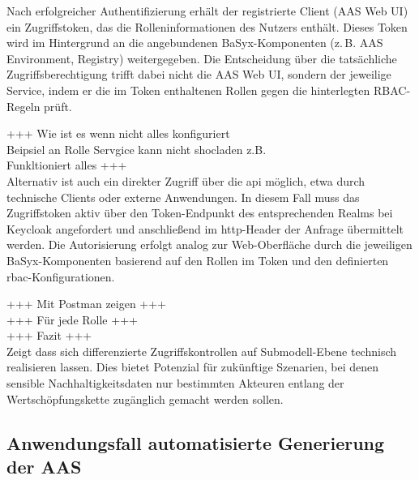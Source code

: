 Nach erfolgreicher Authentifizierung erhält der registrierte Client (AAS Web UI) ein Zugriffstoken, das die Rolleninformationen des Nutzers enthält.  
Dieses Token wird im Hintergrund an die angebundenen BaSyx-Komponenten (z.\,B. AAS Environment, Registry) weitergegeben.  
Die Entscheidung über die tatsächliche Zugriffsberechtigung trifft dabei nicht die AAS Web UI, sondern der jeweilige Service, indem er die im Token enthaltenen Rollen gegen die hinterlegten RBAC-Regeln prüft.

+++ Wie ist es wenn nicht alles konfiguriert \\
Beipsiel an Rolle Servgice kann nicht shocladen z.B.\\
 Funkltioniert alles +++\\

Alternativ ist auch ein direkter Zugriff über die \acs{api} möglich, etwa durch technische Clients oder externe Anwendungen.  
In diesem Fall muss das Zugriffstoken aktiv über den Token-Endpunkt des entsprechenden Realms bei Keycloak angefordert und anschließend im \acs{http}-Header der Anfrage übermittelt werden.  
Die Autorisierung erfolgt analog zur Web-Oberfläche durch die jeweiligen BaSyx-Komponenten basierend auf den Rollen im Token und den definierten \acs{rbac}-Konfigurationen.

+++ Mit Postman zeigen +++\\
+++ Für jede Rolle +++\\

+++ Fazit +++ \\

Zeigt dass sich differenzierte Zugriffskontrollen auf Submodell-Ebene technisch realisieren lassen. 
Dies bietet Potenzial für zukünftige Szenarien, bei denen sensible Nachhaltigkeitsdaten nur bestimmten Akteuren entlang der Wertschöpfungskette zugänglich gemacht werden sollen.

\subsection{Anwendungsfall automatisierte Generierung der AAS}

